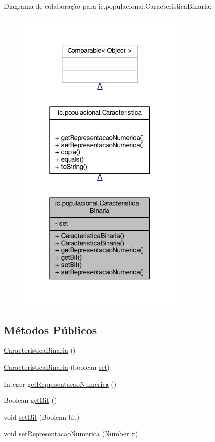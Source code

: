 Diagrama de colaboração para ic.\-populacional.\-Caracteristica\-Binaria\-:\nopagebreak
\begin{figure}[H]
\begin{center}
\leavevmode
\includegraphics[width=232pt]{classic_1_1populacional_1_1_caracteristica_binaria__coll__graph}
\end{center}
\end{figure}
\subsection*{Métodos Públicos}
\begin{DoxyCompactItemize}
\item 
\hyperlink{classic_1_1populacional_1_1_caracteristica_binaria_ab880d3dce17d41139467875d0b708f4e}{Caracteristica\-Binaria} ()
\item 
\hyperlink{classic_1_1populacional_1_1_caracteristica_binaria_ad7bdf9aa5feab2d615b5b7459b746467}{Caracteristica\-Binaria} (boolean \hyperlink{classic_1_1populacional_1_1_caracteristica_binaria_aa0cb4f115639d971f6b6d24dba1d2e15}{set})
\item 
Integer \hyperlink{classic_1_1populacional_1_1_caracteristica_binaria_ab485a6164f4d1554df1c12dfb5115565}{get\-Representacao\-Numerica} ()
\item 
Boolean \hyperlink{classic_1_1populacional_1_1_caracteristica_binaria_ab214793bb2d5f8c021d50e204c928e92}{get\-Bit} ()
\item 
void \hyperlink{classic_1_1populacional_1_1_caracteristica_binaria_a532fecf35da0a7b911eb2638b1eb064b}{set\-Bit} (Boolean bit)
\item 
void \hyperlink{classic_1_1populacional_1_1_caracteristica_binaria_a9fcfd9670e8f51b8c5142cb4c15a19c5}{set\-Representacao\-Numerica} (Number x)
\end{DoxyCompactItemize}
